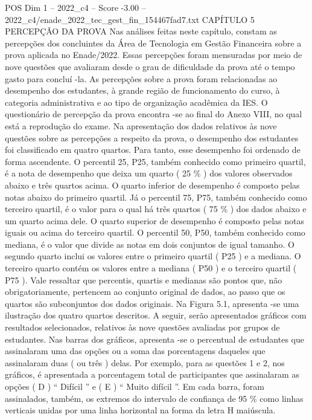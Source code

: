 \begin{textsample}{POS Dim 1 – 2022\_c4 – Score -3.00 – 2022\_c4/enade\_2022\_tec\_gest\_fin\_154467fad7.txt}  \label{ex:f1_pos_258}
CAPÍTULO 5 PERCEPÇÃO DA PROVA Nas análises feitas neste capítulo, constam as percepções dos concluintes da Área de Tecnologia em Gestão Financeira sobre a prova aplicada no Enade/2022.
Essas percepções foram mensuradas por meio de nove questões que avaliaram desde o grau de dificuldade da prova até o tempo gasto para concluí -la.
As percepções sobre a prova foram relacionadas ao desempenho dos estudantes, à grande região de funcionamento do curso, à categoria administrativa e ao tipo de organização acadêmica da IES.
O questionário de percepção da prova encontra -se ao final do Anexo VIII, no qual está a reprodução do exame.
Na apresentação dos dados relativos às nove questões sobre as percepções a respeito da prova, o desempenho dos estudantes foi classificado em quatro quartos.
Para tanto, esse desempenho foi ordenado de forma ascendente.
O percentil 25, P25, também conhecido como primeiro quartil, é a nota de desempenho que deixa um quarto ( 25 \% ) dos valores observados abaixo e três quartos acima.
O quarto inferior de desempenho é composto pelas notas abaixo do primeiro quartil.
Já o percentil 75, P75, também conhecido como terceiro quartil, é o valor para o qual há três quartos ( 75 \% ) dos dados abaixo e um quarto acima dele.
O quarto superior de desempenho é composto pelas notas iguais ou acima do terceiro quartil.
O percentil 50, P50, também conhecido como mediana, é o valor que divide as notas em dois conjuntos de igual tamanho.
O segundo quarto inclui os valores entre o primeiro quartil ( P25 ) e a mediana.
O terceiro quarto contém os valores entre a mediana ( P50 ) e o terceiro quartil ( P75 ).
Vale ressaltar que percentis, quartis e medianas são pontos que, não obrigatoriamente, pertencem ao conjunto original de dados, ao passo que os quartos são subconjuntos dos dados originais.
Na Figura 5.1, apresenta -se uma ilustração dos quatro quartos descritos.
A seguir, serão apresentados gráficos com resultados selecionados, relativos às nove questões avaliadas por grupos de estudantes.
Nas barras dos gráficos, apresenta -se o percentual de estudantes que assinalaram uma das opções ou a soma das porcentagens daqueles que assinalaram duas ( ou três ) delas.
Por exemplo, para as questões 1 e 2, nos gráficos, é apresentada a porcentagem total de participantes que assinalaram as opções ( D ) “ Difícil ” e ( E ) “ Muito difícil ”.
Em cada barra, foram assinalados, também, os extremos do intervalo de confiança de 95 \% como linhas verticais unidas por uma linha horizontal na forma da letra H maiúscula.

\end{textsample}
